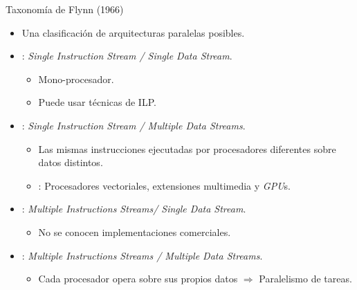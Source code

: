 \begin{frame}[t]{Taxonomía de Flynn (1966)}
\begin{itemize}
  \item Una clasificación de arquitecturas paralelas posibles.

  \item {}: \emph{Single Instruction Stream / Single Data Stream}.
    \begin{itemize}
      \item Mono-procesador.
      \item Puede usar técnicas de ILP.
    \end{itemize}

  \item {}: \emph{Single Instruction Stream / Multiple Data Streams}.
    \begin{itemize}
      \item Las mismas instrucciones ejecutadas por procesadores diferentes sobre datos distintos.
      \item {}: Procesadores vectoriales, extensiones multimedia y \emph{GPU}s.
    \end{itemize}

  \item {}: \emph{Multiple Instructions Streams/ Single Data Stream}.
    \begin{itemize}
      \item No se conocen implementaciones comerciales.
    \end{itemize}

  \item {}: \emph{Multiple Instructions Streams / Multiple Data Streams}.
    \begin{itemize}
      \item Cada procesador opera sobre sus propios datos $\Rightarrow$ Paralelismo de tareas.
    \end{itemize}
\end{itemize}
\end{frame}

